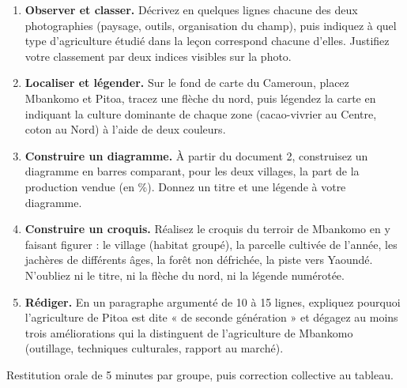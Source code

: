 \documentclass[11pt]{article}
\newcounter{popsec}
\newcounter{popsub}
\newcommand{\courssub}[1]{%
  \stepcounter{popsub}%
  \par\vspace{9pt}\noindent{\popxbold\fontsize{11.5}{13}\selectfont\color{popink}{\color{poporange}\thepopsec.\thepopsub}\hspace{6pt}#1}\par\nopagebreak\vspace{4pt}
}
\begin{document}
\begin{enumerate}
\item \textbf{Observer et classer.} Décrivez en quelques lignes chacune des deux photographies (paysage, outils, organisation du champ), puis indiquez à quel type d'agriculture étudié dans la leçon correspond chacune d'elles. Justifiez votre classement par deux indices visibles sur la photo.
\item \textbf{Localiser et légender.} Sur le fond de carte du Cameroun, placez Mbankomo et Pitoa, tracez une flèche du nord, puis légendez la carte en indiquant la culture dominante de chaque zone (cacao-vivrier au Centre, coton au Nord) à l'aide de deux couleurs.
\item \textbf{Construire un diagramme.} À partir du document 2, construisez un diagramme en barres comparant, pour les deux villages, la part de la production vendue (en \%). Donnez un titre et une légende à votre diagramme.
\item \textbf{Construire un croquis.} Réalisez le croquis du terroir de Mbankomo en y faisant figurer : le village (habitat groupé), la parcelle cultivée de l'année, les jachères de différents âges, la forêt non défrichée, la piste vers Yaoundé. N'oubliez ni le titre, ni la flèche du nord, ni la légende numérotée.
\item \textbf{Rédiger.} En un paragraphe argumenté de 10 à 15 lignes, expliquez pourquoi l'agriculture de Pitoa est dite « de seconde génération » et dégagez au moins trois améliorations qui la distinguent de l'agriculture de Mbankomo (outillage, techniques culturales, rapport au marché).
\end{enumerate}

Restitution orale de 5 minutes par groupe, puis correction collective au tableau.

\courssub{Ressources à mobiliser}
\end{document}
